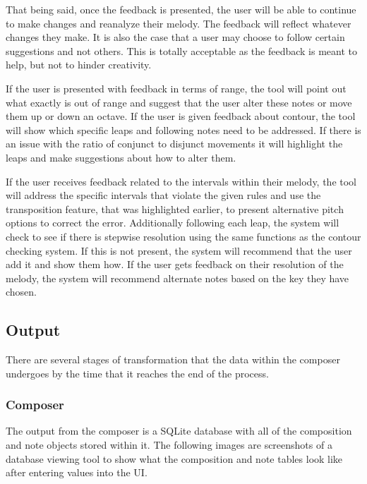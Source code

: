 That being said, once the feedback is presented, the user will be able to continue to make changes and reanalyze their melody.  The feedback will reflect whatever changes they make.  It is also the case that a user may choose to follow certain suggestions and not others.  This is totally acceptable as the feedback is meant to help, but not to hinder creativity.

\vspace{\baselineskip}

If the user is presented with feedback in terms of range, the tool will point out what exactly is out of range and suggest that the user alter these notes or move them up or down an octave.  If the user is given feedback about contour, the tool will show which specific leaps and following notes need to be addressed.  If there is an issue with the ratio of conjunct to disjunct movements it will highlight the leaps and make suggestions about how to alter them.

\vspace{\baselineskip}

If the user receives feedback related to the intervals within their melody, the tool will address the specific intervals that violate the given rules and use the transposition feature, that was highlighted earlier, to present alternative pitch options to correct the error.  Additionally following each leap, the system will check to see if there is stepwise resolution using the same functions as the contour checking system.  If this is not present, the system will recommend that the user add it and show them how.  If the user gets feedback on their resolution of the melody, the system will recommend alternate notes based on the key they have chosen.

\subsection{Output}
\label{subsec:output}

There are several stages of transformation that the data within the composer undergoes by the time that it reaches the end of the process.

\subsubsection{Composer}
\label{subsubsec:composer}

The output from the composer is a SQLite database with all of the composition and note objects stored within it.  The following images are screenshots of a database viewing tool to show what the composition and note tables look like after entering values into the UI.

